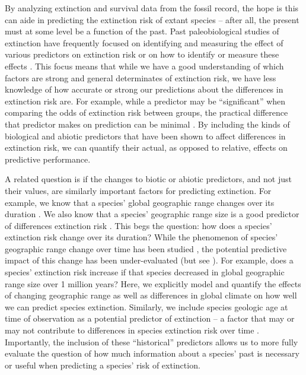 \documentclass[12pt,letterpaper]{article}
\begin{document}
By analyzing extinction and survival data from the fossil record, the hope is this can aide in predicting the extinction risk of extant species -- after all, the present must at some level be a function of the past. Past paleobiological studies of extinction have frequently focused on identifying and measuring the effect of various predictors on extinction risk \citep{Harnik2011,Smits2015,Peters2008,Payne2007,Harnik2012,Ezard2011,Foote2006} or on how to identify or measure these effects \citep{Alroy2010,Alroy2014,Alroy2001,Alroy2000,Alroy2000b,Foote2001}. This focus means that while we have a good understanding of which factors are strong and general determinates of extinction risk, we have less knowledge of how accurate or strong our predictions about the differences in extinction risk are. For example, while a predictor may be ``significant'' when comparing the odds of extinction risk between groups, the practical difference that predictor makes on prediction can be minimal \citep{ARM}. By including the kinds of biological and abiotic predictors that have been shown to affect differences in extinction risk, we can quantify their actual, as opposed to relative, effects on predictive performance.

A related question is if the changes to biotic or abiotic predictors, and not just their values, are similarly important factors for predicting extinction. For example, we know that a species' global geographic range changes over its duration \citep{Foote2007,Liow2010,Liow2007,Kiessling2013}. We also know that a species' geographic range size is a good predictor of differences extinction risk \citep{Payne2007,Jablonski2003,Jablonski2008,Jablonski2006}. This begs the question: how does a species' extinction risk change over its duration? While the phenomenon of species' geographic range change over time has been studied \citep{Foote2007,Liow2010,Liow2007,Kiessling2013}, the potential predictive impact of this change has been under-evaluated (but see \citet{Kiessling2013}). For example, does a species' extinction risk increase if that species decreased in global geographic range size over 1 million years? Here, we explicitly model and quantify the effects of changing geographic range as well as differences in global climate on how well we can predict species extinction. Similarly, we include species geologic age at time of observation as a potential predictor of extinction -- a factor that may or may not contribute to differences in species extinction risk over time \citep{Smits2015,Finnegan2008,Ezard2012,VanValen1973,Liow2011,Crampton2016}. Importantly, the inclusion of these ``historical'' predictors allows us to more fully evaluate the question of how much information about a species' past is necessary or useful when predicting a species' risk of extinction.
\end{document}

